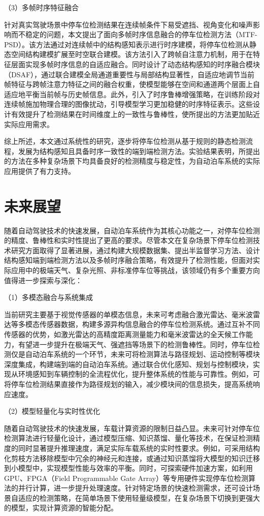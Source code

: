 （3）多帧时序特征融合

针对真实驾驶场景中停车位检测结果在连续帧条件下易受遮挡、视角变化和噪声影响而不稳定的问题，本文提出了面向多帧时序信息融合的停车位检测方法（MTF-PSD）。该方法通过对连续帧中的结构感知表示进行时序建模，将停车位检测从静态空间结构建模扩展至时空联合建模。该方法引入了跨帧自注意力机制，用于在特征层面实现多帧时序信息的自适应融合。同时设计了动态结构感知的时序融合模块（DSAF），通过联合建模全局通道重要性与局部结构显著性，自适应地调节当前帧特征与跨帧注意力特征之间的融合权重，使模型能够在空间和通道两个层面上自适应地平衡当前帧与历史帧信息。此外，引入了时序鲁棒增强策略，在训练阶段对连续帧施加物理合理的图像扰动，引导模型学习更加稳健的时序特征表示。这些设计有效提升了检测结果在时间维度上的一致性与鲁棒性，使所提出的方法更加贴近实际应用需求。

综上所述，本文通过系统性的研究，逐步将停车位检测从基于规则的静态检测流程，发展为结构感知且具备时序一致性的端到端检测方法。实验结果表明，所提出的方法在多种复杂场景下均具备良好的检测精度与稳定性，为自动泊车系统的实际应用提供了有力支持。


\section{未来展望}

随着自动驾驶技术的快速发展，自动泊车系统作为其核心功能之一，对停车位检测的精度、鲁棒性和实时性提出了更高的要求。尽管本文在复杂场景下停车位检测技术研究方面取得了显著进展，通过构建大规模数据集、提出半监督学习方法、设计结构感知端到端检测方法以及多帧时序融合策略，有效提升了检测性能，但面对实际应用中的极端天气、复杂光照、非标准停车位等挑战，该领域仍有多个重要方向值得进一步探索与深化：

（1）多模态融合与系统集成

当前研究主要基于视觉传感器的单模态信息，未来可考虑融合激光雷达、毫米波雷达等多模态传感器数据，构建多源异构信息融合的停车位检测系统。通过互补不同传感器的优势，如激光雷达的高精度距离测量能力和毫米波雷达的全天候工作能力，有望进一步提升在极端天气、强遮挡等场景下的检测鲁棒性。同时，停车位检测仅是自动泊车系统的一个环节，未来可将检测算法与路径规划、运动控制等模块深度集成，构建端到端的自动泊车系统。通过联合优化感知、规划与控制模块，实现从环境感知到车辆控制的全流程优化，提升整体系统的性能与可靠性。例如，可将停车位检测结果直接作为路径规划的输入，减少模块间的信息损失，提高系统响应速度。

（2）模型轻量化与实时性优化

随着自动驾驶技术的快速发展，车载计算资源的限制日益凸显。未来可针对停车位检测算法进行轻量化设计，通过模型压缩、知识蒸馏、量化等技术，在保证检测精度的同时显著提升推理速度，满足实际车载系统的实时性要求。例如，可采用结构化剪枝方法移除模型中冗余的神经元和连接，或通过知识蒸馏将大模型的知识迁移到小模型中，实现模型性能与效率的平衡。同时，可探索硬件加速方案，如利用 GPU、FPGA（Field Programmable Gate Array）等专用硬件实现停车位检测算法的并行计算，进一步提升处理速度。针对特定场景的快速检测需求，还可设计场景自适应的检测策略，在简单场景下使用轻量级模型，在复杂场景下切换到更强大的模型，实现计算资源的智能分配。

